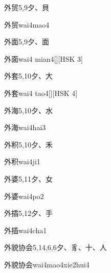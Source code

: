 \begin{entry}{外贸}{5,9}{⼣、⾙}
  \begin{phonetics}{外贸}{wai4mao4}
  \end{phonetics}
\end{entry}

\begin{entry}{外面}{5,9}{⼣、⾯}
  \begin{phonetics}{外面}{wai4 mian4}[][HSK 3]
  \end{phonetics}
\end{entry}

\begin{entry}{外套}{5,10}{⼣、⼤}
  \begin{phonetics}{外套}{wai4 tao4}[][HSK 4]
  \end{phonetics}
\end{entry}

\begin{entry}{外海}{5,10}{⼣、⽔}
  \begin{phonetics}{外海}{wai4hai3}
  \end{phonetics}
\end{entry}

\begin{entry}{外积}{5,10}{⼣、⽲}
  \begin{phonetics}{外积}{wai4ji1}
  \end{phonetics}
\end{entry}

\begin{entry}{外婆}{5,11}{⼣、⼥}
  \begin{phonetics}{外婆}{wai4po2}
  \end{phonetics}
\end{entry}

\begin{entry}{外插}{5,12}{⼣、⼿}
  \begin{phonetics}{外插}{wai4cha1}
  \end{phonetics}
\end{entry}

\begin{entry}{外貌协会}{5,14,6,6}{⼣、⾘、⼗、⼈}
  \begin{phonetics}{外貌协会}{wai4mao4xie2hui4}
  \end{phonetics}
\end{entry}


